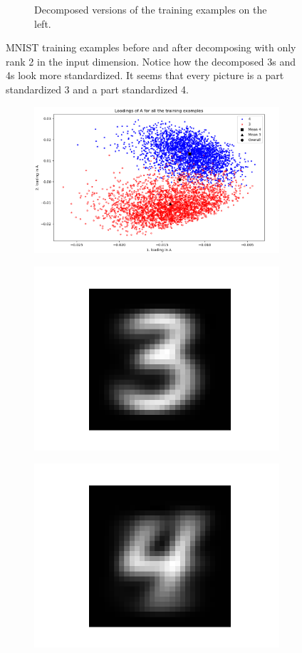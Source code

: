 \begin{figure}
\begin{subfigure}{0.45\linewidth}
        \captionsetup{width=.8\linewidth}
        \caption{Decomposed versions of the training examples on the left.}
    \end{subfigure}
    \captionsetup{width=.95\linewidth}
    \caption{MNIST training examples before and after decomposing with only rank 2 in the input dimension. Notice how the decomposed 3s and 4s look more standardized. It seems that every picture is a part standardized 3 and a part standardized 4. }
    \label{fig:decompExample3_4}
\end{figure}

\begin{figure}
    \centering
    \begin{subfigure}{0.99\linewidth}
        \includegraphics[width=\linewidth]{Pics/05_methodology/LoadingsOfAScatterMNIST.png}
    \end{subfigure}
    \begin{subfigure}{0.3\linewidth}
        \includegraphics[width=.5\linewidth]{Pics/05_methodology/general3.png}
    \end{subfigure}
    \begin{subfigure}{0.3\linewidth}
        \includegraphics[width=.5\linewidth]{Pics/05_methodology/general4.png}

\end{subfigure}
\end{figure}
